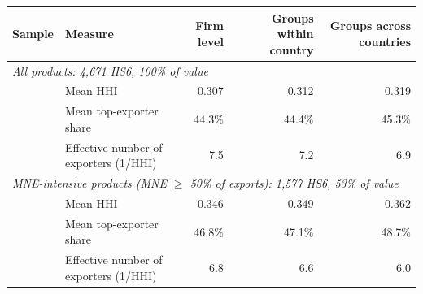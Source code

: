 \begin{tabular}{llrrr}
\toprule
Sample & Measure & Firm level & Groups within country & Groups across countries \\
\midrule
\multicolumn{5}{l}{\textit{All products: 4,671 HS6, 100\% of value}} \\
 & Mean HHI & 0.307 & 0.312 & 0.319 \\
 & Mean top-exporter share & 44.3\% & 44.4\% & 45.3\% \\
 & Effective number of exporters (1/HHI) & 7.5 & 7.2 & 6.9 \\
\multicolumn{5}{l}{\textit{MNE-intensive products (MNE $\geq$ 50\% of exports): 1,577 HS6, 53\% of value}} \\
 & Mean HHI & 0.346 & 0.349 & 0.362 \\
 & Mean top-exporter share & 46.8\% & 47.1\% & 48.7\% \\
 & Effective number of exporters (1/HHI) & 6.8 & 6.6 & 6.0 \\
\bottomrule
\end{tabular}
